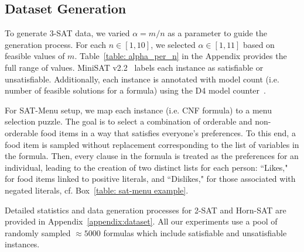 \documentclass{article} %
\begin{document}
\subsection{Dataset Generation}
\label{subsection:dataset generation}

To generate 3-SAT data, we varied $\alpha = m / n$ as a parameter to guide the generation process. For each $n \in [1, 10]$, we selected $\alpha \in [1,11]$ based on feasible values of $m$. Table~\ref{table: alpha_per_n} in the Appendix provides the full range of values. MiniSAT v2.2~\citep{minisat} labels each instance as satisfiable or unsatisfiable. Additionally, each instance is annotated with model count (i.e. number of feasible solutions for a formula) using the D4 model counter~\citep{lagniez2017improved}.



For SAT-Menu setup, we map each instance (i.e. CNF formula) to a menu selection puzzle. The goal is to select a combination of orderable and non-orderable food items in a way that satisfies everyone's preferences. To this end, a food item is sampled without replacement corresponding to the list of variables in the formula. Then, every clause in the formula is treated as the preferences for an individual, leading to the creation of two distinct lists for each person: ``Likes," for food items linked to positive literals, and ``Dislikes," for those associated with negated literals, cf. Box~\ref{table: sat-menu example}.

Detailed statistics and data generation processes for 2-SAT and Horn-SAT are provided in Appendix~\ref{appendix:dataset}. All our experiments use a pool of randomly sampled $\approx 5000$ formulas which include satisfiable and unsatisfiable instances.
\end{document}
